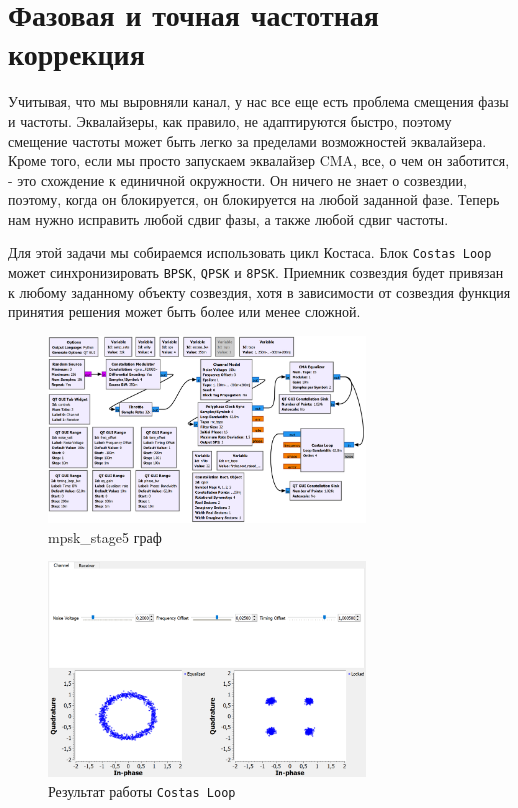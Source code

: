 \documentclass[a4paper,12pt]{article}
\begin{document}
	
	\section{Фазовая и точная частотная коррекция}
	
	Учитывая, что мы выровняли канал, у нас все еще есть проблема смещения фазы и частоты. Эквалайзеры, как правило, не адаптируются быстро, поэтому смещение частоты может быть легко за пределами возможностей эквалайзера. Кроме того, если мы просто запускаем эквалайзер CMA, все, о чем он заботится, - это схождение к единичной окружности. Он ничего не знает о созвездии, поэтому, когда он блокируется, он блокируется на любой заданной фазе. Теперь нам нужно исправить любой сдвиг фазы, а также любой сдвиг частоты.
	
	Для этой задачи мы собираемся использовать цикл Костаса. Блок \texttt{Costas Loop} может синхронизировать \texttt{BPSK}, \texttt{QPSK} и \texttt{8PSK}. Приемник созвездия будет привязан к любому заданному объекту созвездия, хотя в зависимости от созвездия функция принятия решения может быть более или менее сложной.
	
	\begin{figure}[H]
		\centering
		\includegraphics[width=0.75\textwidth]{6_1.png}
		\caption{mpsk\_stage5 граф}
		\label{fig:6.1}
	\end{figure}
	
	\begin{figure}[H]
		\centering
		\includegraphics[width=0.75\textwidth]{6_2.png}
		\caption{Результат работы \texttt{Costas Loop}}
		\label{fig:6.2}
	\end{figure}
\end{document}
